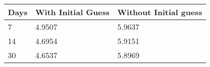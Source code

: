 \begin{tabular}{lll}
Days & With Initial Guess & Without Initial guess \\ 
\hline 
7 & 4.9507 & 5.9637 \\ 
14 & 4.6954 & 5.9151 \\ 
30 & 4.6537 & 5.8969 \\ 
\hline 
\end{tabular}